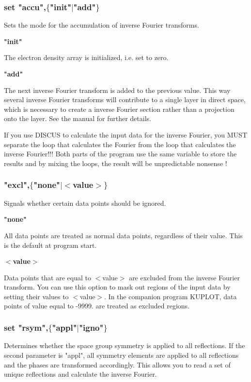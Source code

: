 \subsubsection{set "accu",$ \{$"init"$| $"add"$\} $}
\par
Sets the mode for the accumulation of inverse Fourier transforms. 
\par
{\bf "init" \par }
\vspace{3pt}
The electron density array is initialized, i.e. set to zero. 
\par
{\bf "add" \par }
\vspace{3pt}
The next inverse Fourier transform is added to the previous value. 
This way several inverse Fourier transforms will contribute to a single 
layer in direct space, which is necessary to create a inverse Fourier 
section rather than a projection onto the layer. See the manual for 
further details. 
\par
If you use DISCUS to calculate the input data for the inverse Fourier, 
you MUST separate the loop that calculates the Fourier from the loop 
that calculates the inverse Fourier!!! Both parts of the program use 
the same variable to store the results and by mixing the loops, the 
result will be unpredictable nonsense ! 
\par
\subsubsection{"excl",$ \{$"none"$| $$ <$value$> $$\} $}
\par
Signals whether certain data points should be ignored. 
\par
{\bf "none" \par }
\vspace{3pt}
All data points are treated as normal data points, regardless of their 
value. 
This is the default at program start. 
\par
{\bf $ <$value$> $ \par }
\vspace{3pt}
Data points that are equal to $ <$value$> $ are excluded from the inverse Fourier 
transform. You can use this option to mask out regions of the input 
data by setting their values to $ <$value$> $. 
In the companion program KUPLOT, data points of value equal to -9999. are 
treated as excluded regions. 
\par
\subsubsection{set "rsym",$ \{$"appl"$| $"igno"$\} $}
\par
Determines whether the space group symmetry is applied to all reflections. 
If the second parameter is "appl", all symmetry elements are applied to 
all reflections and the phases are transformed accordingly. This allows 
you to read a set of unique reflections and calculate the inverse Fourier. 

